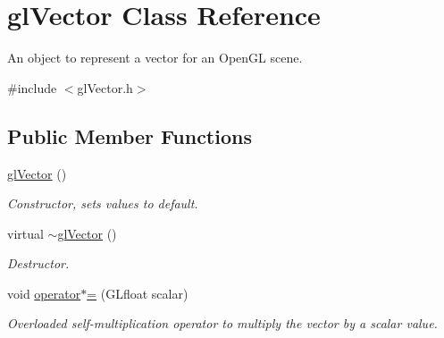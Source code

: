 \hypertarget{classgl_vector}{
\section{glVector Class Reference}
\label{classgl_vector}
}


An object to represent a vector for an OpenGL scene.  




{\ttfamily \#include $<$glVector.h$>$}

\subsection*{Public Member Functions}
\begin{DoxyCompactItemize}
\item 
\hyperlink{classgl_vector_a767c9b823e4acd45f7124a45b1338e64}{glVector} ()
\begin{DoxyCompactList}\small\item\em Constructor, sets values to default. \end{DoxyCompactList}\item 
\hypertarget{classgl_vector_abdaddaea72e51ed8796240b81baa6bb8}{
virtual \hyperlink{classgl_vector_abdaddaea72e51ed8796240b81baa6bb8}{$\sim$glVector} ()}
\label{classgl_vector_abdaddaea72e51ed8796240b81baa6bb8}

\begin{DoxyCompactList}\small\item\em Destructor. \end{DoxyCompactList}\item 
void \hyperlink{classgl_vector_a8dd774eb0589b607fc86463aaa1e3508}{operator$\ast$=} (GLfloat scalar)
\begin{DoxyCompactList}\small\item\em Overloaded self-\/multiplication operator to multiply the vector by a scalar value. \end{DoxyCompactList}\end{DoxyCompactItemize}

